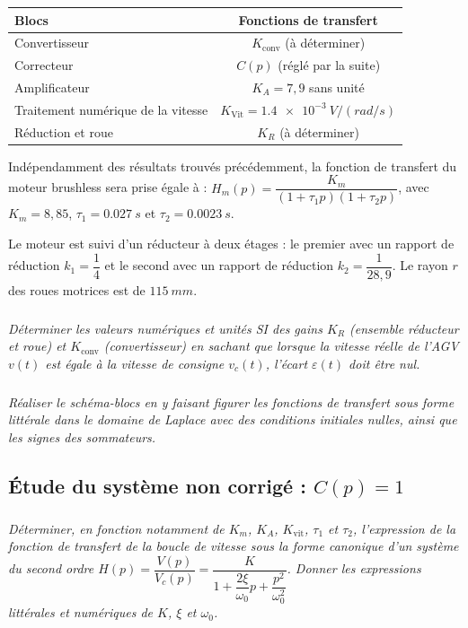\begin{multicols}{2}
\begin{multicols}{2}
\begin{center}
\begin{tabular}{|p{3cm}|c|}
\hline
Blocs & Fonctions de transfert  \\ \hline
Convertisseur & $K_\text{conv}$ (à déterminer) \\ \hline
Correcteur & $C(p)$ (réglé par la suite) \\ \hline
Amplificateur & $K_A = 7,9$ sans unité \\ \hline
Traitement numérique de la vitesse & $K_{\text{Vit}}= \SI{1,4e-3}{V/(rad/s)}$ \\ \hline
Réduction et roue & $K_R$ (à déterminer) \\
\hline
\end{tabular}
\end{center}
Indépendamment des résultats trouvés précédemment, la fonction de transfert du moteur brushless
sera prise égale à :  $H_m(p)=\dfrac{K_m}{\left(1+\tau_1 p\right)\left(1+\tau_2 p\right)}$, avec $K_m=8,85$, $\tau_1=\SI{0,027}{s}$ et $\tau_2=\SI{0,0023}{s}$.

Le moteur est suivi d’un réducteur à deux étages : le premier avec un rapport de réduction $k_1 = \dfrac{1}{4}$ et le second avec un rapport de réduction $k_2 = \dfrac{1}{28,9}$. Le rayon $r$ des roues motrices est de $\SI{115}{mm}$.

\subparagraph{}
\textit{Déterminer les valeurs numériques et unités SI des gains $K_R$ (ensemble réducteur et roue) et
$K_{\text{conv}}$ (convertisseur) en sachant que lorsque la vitesse réelle de l’AGV $v(t)$ est égale à la vitesse
de consigne $v_c(t)$, l’écart $\varepsilon (t)$ doit être nul.}
\ifprof
\begin{corrige}
\end{corrige}
\else
\fi
%
\subparagraph{}
\textit{Réaliser le schéma-blocs en y faisant figurer les fonctions de
transfert sous forme littérale dans le domaine de Laplace avec des conditions initiales nulles,
ainsi que les signes des sommateurs.
}
\ifprof
\begin{corrige}
\end{corrige}
\else
\fi

\subsection*{Étude du système non corrigé : $C(p)=1$}
\subparagraph{}
\textit{Déterminer, en fonction notamment de $K_m$, $K_A$, $K_{\text{vit}}$, $\tau_1$ et $\tau_2$, l'expression de la fonction de transfert de la boucle de vitesse sous la forme canonique d'un système du second ordre $H(p)=\dfrac{V(p)}{V_c(p)}=\dfrac{K}{1+\dfrac{2\xi}{\omega_0}p+\dfrac{p^2}{\omega_0^2}}$. Donner les expressions littérales et numériques de $K$, $\xi$ et $\omega_0$. }


\end{multicols}
\end{multicols}
